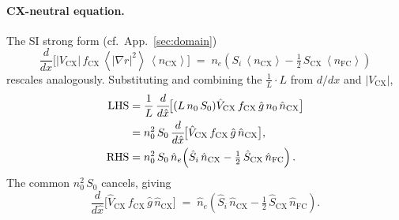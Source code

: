 \documentclass[twocolumn,secnumarabic,amssymb, nobibnotes, aps, prd]{revtex4-2}
\renewcommand{\ne}{n_{e}}  %
\newcommand{\nfc}{n_{\mathrm{FC}}}
\newcommand{\ncx}{n_{\mathrm{CX}}}
\newcommand{\Si}{S_{i}}
\newcommand{\Scx}{S_{\mathrm{CX}}}
\newcommand{\fsa}[1]{\left\langle #1 \right\rangle}
\begin{document}
\paragraph{CX-neutral equation.}
The SI strong form (cf.\ App.~\ref{sec:domain})
\begin{equation}
  \frac{d}{dx}\!\bigl[|V_{\mathrm{CX}}|\,f_{\mathrm{CX}}\,\fsa{|\nabla r|^{2}}\,\fsa{\ncx}\bigr]
  \;=\;\ne\!\left(\Si\,\fsa{\ncx} - \tfrac{1}{2}\,\Scx\,\fsa{\nfc}\right)
\end{equation}
rescales analogously.  Substituting and combining the
$\frac{1}{L}\!\cdot\! L$ from $d/dx$ and $|V_{\mathrm{CX}}|$,
\begin{align}
  \mathrm{LHS}
  &= \frac{1}{L}\,\frac{d}{d\hat x}\!\bigl[(L\,n_{0}\,S_{0})\hat V_{\mathrm{CX}}\,f_{\mathrm{CX}}\,\hat g\,n_{0}\,\hat n_{\mathrm{CX}}\bigr]
   \notag\\
  &= n_{0}^{2}\,S_{0}\,\frac{d}{d\hat x}\!\bigl[\hat V_{\mathrm{CX}}\,f_{\mathrm{CX}}\,\hat g\,\hat n_{\mathrm{CX}}\bigr],\\
  \mathrm{RHS}
  &= n_{0}^{2}\,S_{0}\,\hat n_{e}\!\left(\hat S_{i}\,\hat n_{\mathrm{CX}}
       - \tfrac{1}{2}\,\hat S_{\mathrm{CX}}\,\hat n_{\mathrm{FC}}\right).
\end{align}
The common $n_{0}^{2}\,S_{0}$ cancels, giving
\begin{equation}
  \frac{d}{d\hat x}\!\bigl[\hat V_{\mathrm{CX}}\,f_{\mathrm{CX}}\,\hat g\,\hat n_{\mathrm{CX}}\bigr]
  \;=\; \hat n_{e}\!\left(\hat S_{i}\,\hat n_{\mathrm{CX}}
       - \tfrac{1}{2}\,\hat S_{\mathrm{CX}}\,\hat n_{\mathrm{FC}}\right).
  \label{eq:strong-hat-nCX-A8}
\end{equation}
\end{document}
